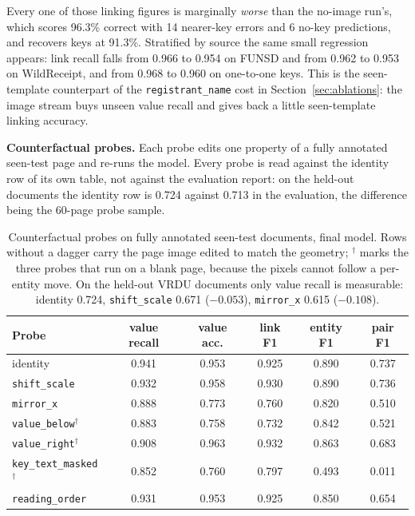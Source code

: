 \documentclass[11pt,a4paper]{article}
\newcommand{\code}[1]{\texttt{\small #1}}
\begin{document}
Every one of those linking figures is marginally \emph{worse} than the no-image run's, which
scores 96.3\% correct with 14 nearer-key errors and 6 no-key predictions, and recovers keys at
91.3\%. Stratified by source the same small regression appears: link recall falls from 0.966 to
0.954 on FUNSD and from 0.962 to 0.953 on WildReceipt, and from 0.968 to 0.960 on one-to-one keys.
This is the seen-template counterpart of the \code{registrant\_name} cost in
Section~\ref{sec:ablations}: the image stream buys unseen value recall and gives back a little
seen-template linking accuracy.

\textbf{Counterfactual probes.} Each probe edits one property of a fully annotated seen-test page
and re-runs the model. Every probe is read against the identity row of its own table, not against
the evaluation report: on the held-out documents the identity row is 0.724 against 0.713 in the
evaluation, the difference being the 60-page probe sample.

\begin{table}[htbp]
\centering\small
\begin{tabular}{@{}lccccc@{}}
\toprule
\textbf{Probe} & \textbf{value recall} & \textbf{value acc.} & \textbf{link F1} & \textbf{entity F1} & \textbf{pair F1} \\
\midrule
identity                    & 0.941 & 0.953 & 0.925 & 0.890 & 0.737 \\
\code{shift\_scale}         & 0.932 & 0.958 & 0.930 & 0.890 & 0.736 \\
\code{mirror\_x}            & 0.888 & 0.773 & 0.760 & 0.820 & 0.510 \\
\code{value\_below}$^\dagger$     & 0.883 & 0.758 & 0.732 & 0.842 & 0.521 \\
\code{value\_right}$^\dagger$     & 0.908 & 0.963 & 0.932 & 0.863 & 0.683 \\
\code{key\_text\_masked}$^\dagger$& 0.852 & 0.760 & 0.797 & 0.493 & 0.011 \\
\code{reading\_order}       & 0.931 & 0.953 & 0.925 & 0.850 & 0.654 \\
\bottomrule
\end{tabular}
\caption{Counterfactual probes on fully annotated seen-test documents, final model. Rows without a
dagger carry the page image edited to match the geometry; $^\dagger$ marks the three probes that
run on a blank page, because the pixels cannot follow a per-entity move. On the held-out VRDU
documents only value recall is measurable: identity 0.724, \code{shift\_scale} 0.671 ($-0.053$),
\code{mirror\_x} 0.615 ($-0.108$).}
\label{tab:probes}
\end{table}
\end{document}
